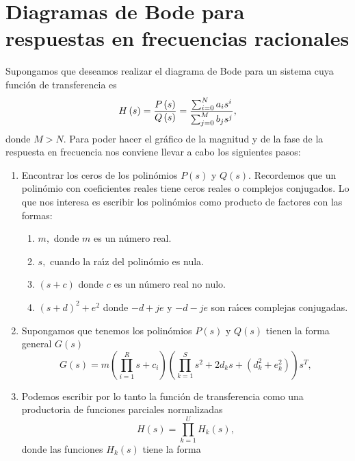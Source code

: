 \section{Diagramas de Bode para respuestas en frecuencias racionales}

Supongamos que deseamos realizar el diagrama de Bode para un sistema cuya
funci\'{o}n de transferencia es 
\begin{equation}
H\left( s\right) =\frac{P\left( s\right) }{Q\left( s\right) }=\frac{%
\sum_{i=0}^{N}a_{i}s^{i}}{\sum_{j=0}^{M}b_{j}s^{j}},
\end{equation}
donde $M>N.$ Para poder hacer el gr\'{a}fico de la magnitud y de la fase de la
respuesta en frecuencia nos conviene llevar a cabo los siguientes pasos:

\begin{enumerate}
\item  Encontrar los ceros de los polin\'{o}mios $P\left( s\right) $ y $Q\left(
s\right) $. Recordemos que un polin\'{o}mio con coeficientes reales tiene ceros
reales o complejos conjugados. Lo que nos interesa es escribir los
polin\'{o}mios como producto de factores con las formas:

\begin{enumerate}
\item  $m,$ donde $m$ es un n\'{u}mero real.

\item  $s,$ cuando la ra\'{\i}z del polin\'{o}mio es nula.

\item  $\left( s+c\right) $ donde $c$ es un n\'{u}mero real no nulo.

\item  $\left( s+d\right) ^{2}+e^{2}$ donde $-d+je$ y $-d-je$
son ra\'{\i}ces complejas conjugadas.
\end{enumerate}

\item  Supongamos que tenemos los polin\'{o}mios $P\left( s\right) $ y $Q\left(
s\right) $ tienen la forma general $G\left( s\right) $ 
\begin{equation}
        G\left( s\right) =
                m\left( \prod_{i=1}^{R}s+c_{i}\right) 
                \left(
                        \prod_{k=1}^{S}s^{2}+2d_{k}s+\left( d_{k}^{2}+e_{k}^{2}\right) 
                \right) s^{T},
\end{equation}

\item  Podemos escribir por lo tanto la funci\'{o}n de transferencia como
una productoria de funciones parciales normalizadas 
\begin{equation}
H\left( s\right) =\prod_{k=1}^{U}H_{k}\left( s\right) ,
\end{equation}
donde las funciones $H_{k}\left( s\right) $ tiene la forma


\end{enumerate}
